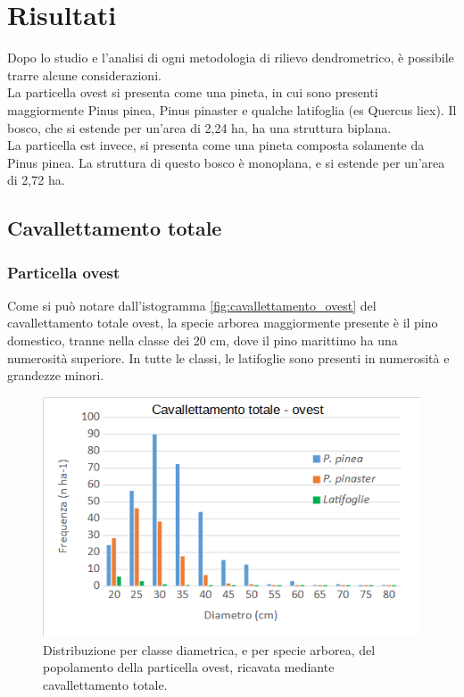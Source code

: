 \section{Risultati}
Dopo lo studio e l'analisi di ogni metodologia di rilievo dendrometrico, è possibile trarre alcune considerazioni.\\
La particella ovest si presenta come una pineta, in cui sono presenti maggiormente Pinus pinea, Pinus pinaster e qualche latifoglia (es Quercus liex). Il bosco, che si estende per un'area di 2,24 ha, ha una struttura biplana.\\
La particella est invece, si presenta come una pineta composta solamente da Pinus pinea. La struttura di questo bosco è monoplana, e si estende per un'area di 2,72 ha.
\subsection{Cavallettamento totale}
\subsubsection*{Particella ovest}
Come si può notare dall'istogramma \autoref{fig:cavallettamento_ovest} del cavallettamento  totale ovest, la specie arborea maggiormente presente è il pino domestico, tranne nella classe dei 20 cm, dove il pino marittimo ha una numerosità superiore. In tutte le classi, le latifoglie sono presenti in numerosità e grandezze minori.
\begin{figure}[H]
    \centering
    \includegraphics[width=0.7 \textwidth]{immagini/cav-tot-ovest.png}
    \caption{Distribuzione per classe diametrica, e per specie arborea, del popolamento della particella ovest, ricavata mediante cavallettamento totale.}
    \label{fig:cavallettamento_ovest}
\end{figure}

